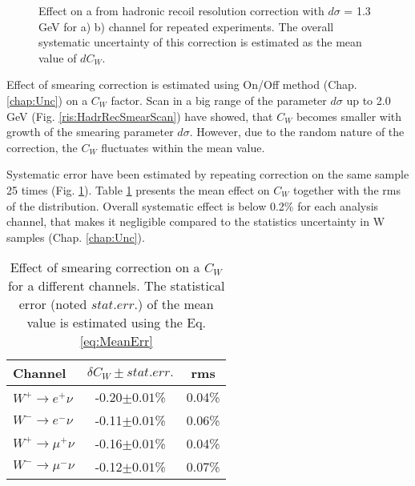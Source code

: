 \begin{figure}[!tbp]
\begin{minipage}[h]{0.49\linewidth}
\end{minipage}
\hfill
\begin{minipage}[h]{0.49\linewidth}
\end{minipage}
\caption{Effect on a \cw from hadronic recoil resolution correction with $d\sigma$ = 1.3 GeV for a) \wenu b) \wmunu channel for repeated experiments. The overall systematic uncertainty of this correction is estimated as the mean value of $dC_{W}$. }
\label{ris:HadrRecSmearStab}
\end{figure}

Effect of smearing correction is estimated using On/Off method (Chap. \ref{chap:Unc}) on a $C_{W}$ factor. Scan in a big range of the  parameter $d\sigma$ up to  2.0 GeV (Fig. \ref{ris:HadrRecSmearScan}) have showed, that $C_{W}$ becomes smaller with growth of the smearing parameter $d\sigma$. However, due to the random nature of the correction, the $C_{W}$ fluctuates within the mean value.

Systematic error have been estimated by repeating correction on the same sample 25 times (Fig. \ref{ris:HadrRecSmearStab}). Table \ref{SmearCW} presents the mean effect on $C_{W}$ together with the rms of the distribution. Overall systematic effect is below 0.2\% for each analysis channel, that makes it negligible compared to the statistics uncertainty in W samples (Chap. \ref{chap:Unc}).


 \begin{table}[!t]
 \caption{Effect of smearing correction on a $C_{W}$ for a different channels. The statistical error (noted $stat.err.$) of the mean value is estimated using the Eq. \ref{eq:MeanErr}}
\label{SmearCW}
\begin{center}
\begin{tabular}{| l  | c | c | }
\hline
Channel & $\delta C_W \pm stat.err.$ & rms \\
\hline
\hline
$W^{+} \to e^{+}\nu$ & -0.20$\pm0.01$\% & 0.04\% \\
$W^{-} \to e^{-}\nu$ & -0.11$\pm0.01$\% &  0.06\% \\
\hline
$W^{+} \to \mu^{+}\nu$ & -0.16$\pm0.01$\% & 0.04\% \\
$W^{-} \to \mu^{-}\nu$ & -0.12$\pm0.01$\% & 0.07\% \\
\hline
\end{tabular}
\end{center}

\end{table}

